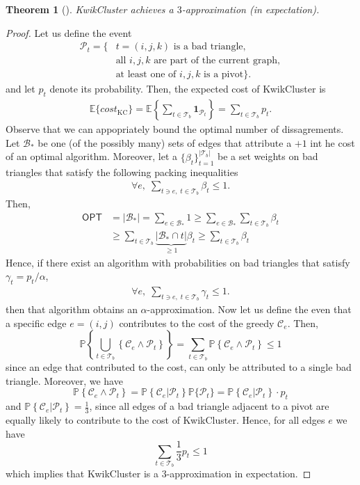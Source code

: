 \documentclass{article} %
\newtheorem{theo}{Theorem}
\newcommand{\OPT}{\mathsf{OPT}}
\newcommand{\Tb}{\mathcal{T}_b}
\renewcommand{\Pr}{\mathbb{P}}
\begin{document}
\begin{theo}[\cite{ailon2008aggregating}]
KwikCluster achieves a $3$-approximation (in expectation).
\end{theo}
\begin{proof}
Let us define the event 
\begin{align*}
\mathcal{P}_t = \{&\text{$t=(i,j,k)$ is a bad triangle}, \\
&\text{all $i,j,k$ are part of the current graph}, \\
&\text{at least one of $i,j,k$ is a pivot}\}.
\end{align*}
and let $p_t$ denote its probability.
Then, the expected cost of KwikCluster is
\begin{align*}
\mathbb{E}\{cost_{\text{KC}}\} = \mathbb{E}\left\{\sum_{t \in \mathcal{T}_b} \mathbf{1}_{\mathcal{P}_t} \right\} = \sum_{t \in \mathcal{T}_b} p_t.
\end{align*}
Observe that we can appopriately bound the optimal number of dissagrements.
Let $\mathcal{B}_*$ be one (of the possibly many) sets of edges that attribute a $+1$ int he cost of an optimal algorithm.
Moreover, let a $\{\beta_t\}_{t=1}^{|\mathcal{T}_b|}$ be a set weights on bad triangles that satisfy the following packing inequalities
\begin{align*}
\forall e,\; \sum_{t\ni e,\; t \in \Tb} \beta_t \le 1.
\end{align*}
Then,
\begin{align*}
\OPT &= |\mathcal{B}_*| = \sum_{e \in \mathcal{B}_*} 1 \ge \sum_{e \in \mathcal{B}_*} \sum_{t\in \mathcal{T}_b} \beta_t\\
& \ge \sum_{t\in \mathcal{T}_b} \underbrace{|\mathcal{B}_*\cap t|}_{\ge1} \beta_t \ge \sum_{t\in \mathcal{T}_b} \beta_t
\end{align*}
Hence, if there exist an algorithm with probabilities on bad triangles that satisfy $\gamma_t = p_t/\alpha$, 
\begin{align*}
\forall e,\; \sum_{t\ni e,\; t \in \Tb} \gamma_t \le 1.
\end{align*}
then that algorithm obtains an $\alpha$-approximation.
Now let us define the even that a specific edge $e = (i,j)$ contributes to the cost of the greedy $\mathcal{C}_e$.
Then, 
$$\Pr\left\{\bigcup_{t\in \Tb} \left\{\mathcal{C}_e \wedge \mathcal{P}_t\right\}\right\}=\sum_{t\in \Tb}\Pr \left\{\mathcal{C}_e \wedge \mathcal{P}_t\right\}\le 1$$
since an edge that contributed to the cost, can only be attributed to a single bad triangle.
Moreover, we have 
$$\Pr \left\{\mathcal{C}_e \wedge \mathcal{P}_t\right\}
= \Pr \left\{\mathcal{C}_e \left| \mathcal{P}_t\right. \right\} \Pr\{\mathcal{P}_t\}
=\Pr \left\{\mathcal{C}_e \left| \mathcal{P}_t\right. \right\}\cdot p_t 
$$
and $\Pr \left\{\mathcal{C}_e \left| \mathcal{P}_t\right. \right\}=\frac{1}{3}$, since all edges of a bad triangle adjacent to a pivot are equally likely to contribute to the cost of KwikCluster.
Hence, for all edges $e$ we have
$$\sum_{t\in \Tb}\frac{1}{3}p_t\le 1$$
which implies that KwikCluster is a $3$-approximation in expectation.
\end{proof}
\end{document}
